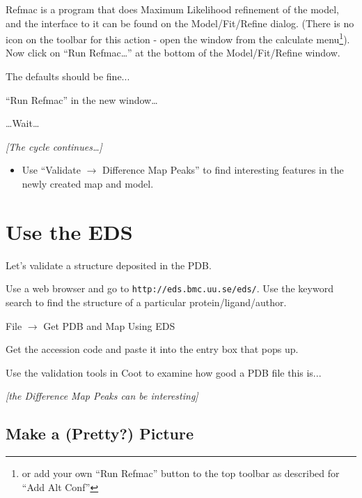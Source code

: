 \documentclass{article}
\begin{document}
Refmac is a program that does Maximum Likelihood refinement of the
model, and the interface to it can be found on the Model/Fit/Refine
dialog. (There is no icon on the toolbar for this action - open the
window from the calculate menu\footnote{or add your own ``Run Refmac''
button to the top toolbar as described for ``Add Alt Conf''}). Now 
click on \textsf{``Run Refmac\ldots''} at the bottom of the 
Model/Fit/Refine window.

The defaults should be fine...

\textsf{``Run Refmac''} in the new window\ldots

\ldots Wait\ldots

\emph{[The cycle continues\ldots]}

\begin{itemize}
\item Use \textsf{``Validate $\rightarrow$ Difference Map Peaks''} to
  find interesting features in the newly created map and model.
\end{itemize}


\section{Use the EDS}

\begin{trivlist}
\item Let's validate a structure deposited in the PDB.

\item Use a web browser and go to \texttt{http://eds.bmc.uu.se/eds/}.  Use
the keyword search to find the structure of a particular
protein/ligand/author.  

\item \textsf{File $\rightarrow$ Get PDB and Map Using EDS}
  
\item Get the accession code and paste it into the entry box that pops
  up.
  
\item Use the validation tools in Coot to examine how good a PDB file
  this is... 

\item \emph{[the Difference Map Peaks can be interesting]}

\end{trivlist}


\subsection{Make a (Pretty?) Picture}
\end{document}
